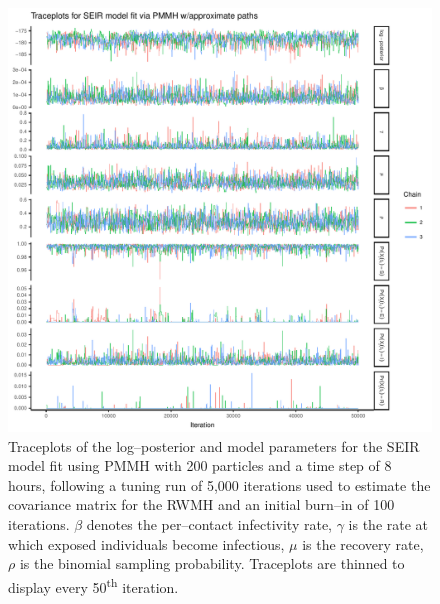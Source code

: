 \begin{figure}[htbp]
	\centering
	\includegraphics[width=0.9\linewidth]{figures/seir_pomp_approx_traceplots}
	\caption[Simulation 1 MCMC traceplots for an SEIR model fit using PMMH with approximate particle paths.]{Traceplots of the log--posterior and model parameters for the SEIR model fit using PMMH with 200 particles and a time step of 8 hours, following a tuning run of 5,000 iterations used to estimate the covariance matrix for the RWMH and an initial burn--in of 100 iterations. $ \beta $ denotes the per--contact infectivity rate, $ \gamma $ is the rate at which exposed individuals become infectious, $ \mu $ is the recovery rate, $ \rho $ is the binomial sampling probability. Traceplots are thinned to display every 50\textsuperscript{th} iteration.}
	\label{fig:seirpompapproxtraceplots}
\end{figure}


